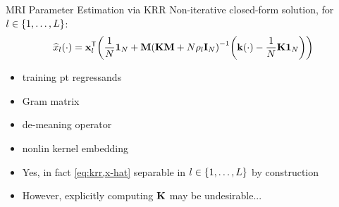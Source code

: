 \begin{frame}{MRI Parameter Estimation via KRR}
	Non-iterative closed-form solution, for $l \in \set{1,\dots,L}$: 
	\begin{align}
		\est{x}_l\paren{\cdot} = \bmxg{l}\tpose\paren{
			\frac{1}{N}\ones{N} 
			+ \bmM\inv{\bmK\bmM + N\rho_l \eye{N}} 
			\paren{\bmka{\cdot} - \frac{1}{N}\bmK\ones{N}}
		}
		\label{eq:krr,x-hat}
	\end{align}
	\begin{itemize}
	\item<1-4>{%
		training pt regressands
	}
	\item<2-4,6>{%
		Gram matrix
	}						
	\item<3-4>{%
		de-meaning operator
	}
	\item<4>{%
		nonlin kernel embedding
	}
	\end{itemize}
	\begin{itemize}
		\item<5>{Yes, in fact \eqref{eq:krr,x-hat} separable in $l \in \set{1,\dots,L}$ by construction}
		\item<6>{However, explicitly computing $\mathbf{K}$ may be undesirable...}
	\end{itemize}
\end{frame}

